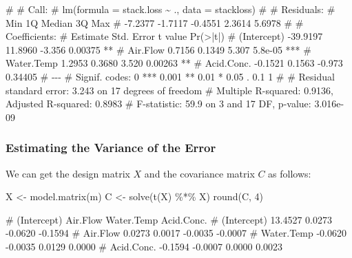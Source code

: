 \documentclass[
  a4paper,
]{article}
\newenvironment{Shaded}{\begin{snugshade}}{\end{snugshade}}
\newcommand{\DecValTok}[1]{\textcolor[rgb]{0.00,0.00,0.81}{#1}}
\newcommand{\FunctionTok}[1]{\textcolor[rgb]{0.00,0.00,0.00}{#1}}
\newcommand{\NormalTok}[1]{#1}
\newcommand{\OtherTok}[1]{\textcolor[rgb]{0.56,0.35,0.01}{#1}}
\newcommand{\SpecialCharTok}[1]{\textcolor[rgb]{0.00,0.00,0.00}{#1}}
\theoremstyle{definition}
\theoremstyle{definition}
\theoremstyle{definition}
\theoremstyle{definition}
\theoremstyle{remark}
\begin{document}
\begin{Shaded}
\begin{Highlighting}[]
\NormalTok{\# }
\NormalTok{\# Call:}
\NormalTok{\# lm(formula = stack.loss \textasciitilde{} ., data = stackloss)}
\NormalTok{\# }
\NormalTok{\# Residuals:}
\NormalTok{\#     Min      1Q  Median      3Q     Max }
\NormalTok{\# {-}7.2377 {-}1.7117 {-}0.4551  2.3614  5.6978 }
\NormalTok{\# }
\NormalTok{\# Coefficients:}
\NormalTok{\#             Estimate Std. Error t value Pr(\textgreater{}|t|)    }
\NormalTok{\# (Intercept) {-}39.9197    11.8960  {-}3.356  0.00375 ** }
\NormalTok{\# Air.Flow      0.7156     0.1349   5.307  5.8e{-}05 ***}
\NormalTok{\# Water.Temp    1.2953     0.3680   3.520  0.00263 ** }
\NormalTok{\# Acid.Conc.   {-}0.1521     0.1563  {-}0.973  0.34405    }
\NormalTok{\# {-}{-}{-}}
\NormalTok{\# Signif. codes:  0 \textquotesingle{}***\textquotesingle{} 0.001 \textquotesingle{}**\textquotesingle{} 0.01 \textquotesingle{}*\textquotesingle{} 0.05 \textquotesingle{}.\textquotesingle{} 0.1 \textquotesingle{} \textquotesingle{} 1}
\NormalTok{\# }
\NormalTok{\# Residual standard error: 3.243 on 17 degrees of freedom}
\NormalTok{\# Multiple R{-}squared:  0.9136,  Adjusted R{-}squared:  0.8983 }
\NormalTok{\# F{-}statistic:  59.9 on 3 and 17 DF,  p{-}value: 3.016e{-}09}
\end{Highlighting}
\end{Shaded}

\hypertarget{estimating-the-variance-of-the-error}{%
\subsubsection{Estimating the Variance of the Error}\label{estimating-the-variance-of-the-error}}

We can get the design matrix \(X\) and the covariance matrix \(C\) as follows:

\begin{Shaded}
\begin{Highlighting}[]
\NormalTok{X }\OtherTok{\textless{}{-}} \FunctionTok{model.matrix}\NormalTok{(m)}
\NormalTok{C }\OtherTok{\textless{}{-}} \FunctionTok{solve}\NormalTok{(}\FunctionTok{t}\NormalTok{(X) }\SpecialCharTok{\%*\%}\NormalTok{ X)}
\FunctionTok{round}\NormalTok{(C, }\DecValTok{4}\NormalTok{)}
\end{Highlighting}
\end{Shaded}

\begin{Shaded}
\begin{Highlighting}[]
\NormalTok{\#             (Intercept) Air.Flow Water.Temp Acid.Conc.}
\NormalTok{\# (Intercept)     13.4527   0.0273    {-}0.0620    {-}0.1594}
\NormalTok{\# Air.Flow         0.0273   0.0017    {-}0.0035    {-}0.0007}
\NormalTok{\# Water.Temp      {-}0.0620  {-}0.0035     0.0129     0.0000}
\NormalTok{\# Acid.Conc.      {-}0.1594  {-}0.0007     0.0000     0.0023}
\end{Highlighting}
\end{Shaded}
\end{document}
